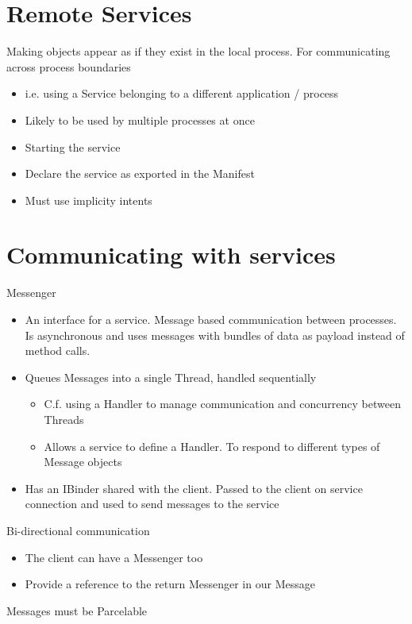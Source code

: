 \documentclass{article}
\begin{document}
\section{Remote Services}

\begin{flushleft}
Making objects appear as if they exist in the local process. For	communicating	across	process	boundaries
\begin{itemize}
  \item i.e. using a Service belonging to a different application / process
  \item Likely to be used by multiple processes at once
  \item Starting the service
  \item Declare the service as exported in the Manifest
  \item Must use implicity intents
\end{itemize}
\end{flushleft}

\section{Communicating with services}

\begin{flushleft}
Messenger
\begin{itemize}
  \item An interface for a service. Message based communication between processes. Is asynchronous and uses messages with bundles of data as payload instead of method calls.
  \item Queues Messages into a single Thread, handled sequentially
  \begin{itemize}
    \item C.f. using a Handler to manage communication and concurrency between Threads
    \item Allows a service to define a Handler. To respond to different types of Message objects
  \end{itemize}
  \item Has an IBinder shared with the client. Passed to the client on service connection and used to send messages to the service
\end{itemize}
Bi-directional communication
\begin{itemize}
  \item The client can have a Messenger too
  \item Provide a reference to the return Messenger in our Message
\end{itemize}
Messages must be Parcelable
\end{flushleft}
\end{document}
